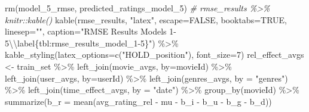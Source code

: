 \documentclass[
]{article}
\newenvironment{Shaded}{}{}
\newcommand{\AttributeTok}[1]{\textcolor[rgb]{0.49,0.56,0.16}{#1}}
\newcommand{\CommentTok}[1]{\textcolor[rgb]{0.38,0.63,0.69}{\textit{#1}}}
\newcommand{\ConstantTok}[1]{\textcolor[rgb]{0.53,0.00,0.00}{#1}}
\newcommand{\DecValTok}[1]{\textcolor[rgb]{0.25,0.63,0.44}{#1}}
\newcommand{\FunctionTok}[1]{\textcolor[rgb]{0.02,0.16,0.49}{#1}}
\newcommand{\NormalTok}[1]{#1}
\newcommand{\OtherTok}[1]{\textcolor[rgb]{0.00,0.44,0.13}{#1}}
\newcommand{\SpecialCharTok}[1]{\textcolor[rgb]{0.25,0.44,0.63}{#1}}
\newcommand{\StringTok}[1]{\textcolor[rgb]{0.25,0.44,0.63}{#1}}
\begin{document}
\begin{Shaded}
\begin{Highlighting}[]
\FunctionTok{rm}\NormalTok{(model\_5\_rmse, predicted\_ratings\_model\_5)}
\CommentTok{\# rmse\_results \%\textgreater{}\% knitr::kable()}
  \FunctionTok{kable}\NormalTok{(rmse\_results, }\StringTok{"latex"}\NormalTok{, }\AttributeTok{escape=}\ConstantTok{FALSE}\NormalTok{, }\AttributeTok{booktabs=}\ConstantTok{TRUE}\NormalTok{, }\AttributeTok{linesep=}\StringTok{""}\NormalTok{, }\AttributeTok{caption=}\StringTok{"RMSE Results Models 1{-}5}\SpecialCharTok{\textbackslash{}\textbackslash{}}\StringTok{label\{tbl:rmse\_results\_model\_1{-}5\}"}\NormalTok{) }\SpecialCharTok{\%\textgreater{}\%}
    \FunctionTok{kable\_styling}\NormalTok{(}\AttributeTok{latex\_options=}\FunctionTok{c}\NormalTok{(}\StringTok{"HOLD\_position"}\NormalTok{), }\AttributeTok{font\_size=}\DecValTok{7}\NormalTok{)}
\NormalTok{rel\_effect\_avgs }\OtherTok{\textless{}{-}}\NormalTok{ train\_set }\SpecialCharTok{\%\textgreater{}\%}
  \FunctionTok{left\_join}\NormalTok{(movie\_avgs, }\AttributeTok{by=}\StringTok{\textquotesingle{}movieId\textquotesingle{}}\NormalTok{) }\SpecialCharTok{\%\textgreater{}\%}
  \FunctionTok{left\_join}\NormalTok{(user\_avgs, }\AttributeTok{by=}\StringTok{\textquotesingle{}userId\textquotesingle{}}\NormalTok{) }\SpecialCharTok{\%\textgreater{}\%} 
  \FunctionTok{left\_join}\NormalTok{(genres\_avgs, }\AttributeTok{by =} \StringTok{"genres"}\NormalTok{) }\SpecialCharTok{\%\textgreater{}\%} 
  \FunctionTok{left\_join}\NormalTok{(time\_effect\_avgs, }\AttributeTok{by =} \StringTok{"date"}\NormalTok{) }\SpecialCharTok{\%\textgreater{}\%} 
  \FunctionTok{group\_by}\NormalTok{(movieId) }\SpecialCharTok{\%\textgreater{}\%} 
  \FunctionTok{summarize}\NormalTok{(}\AttributeTok{b\_r =} \FunctionTok{mean}\NormalTok{(avg\_rating\_rel }\SpecialCharTok{{-}}\NormalTok{ mu }\SpecialCharTok{{-}}\NormalTok{ b\_i }\SpecialCharTok{{-}}\NormalTok{ b\_u }\SpecialCharTok{{-}}\NormalTok{ b\_g }\SpecialCharTok{{-}}\NormalTok{ b\_d))}


\end{Highlighting}
\end{Shaded}
\end{document}
